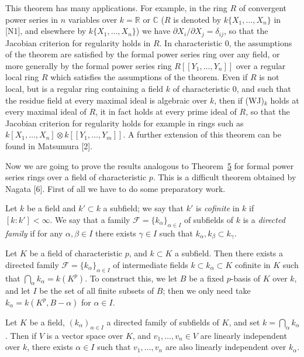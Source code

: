 This theorem has many applications. For example, in the ring $R$ of convergent
power series in $n$ variables over $k = \mathbb{R}$ or $\mathbb{C}$ ($R$ is denoted by
$k\{X_1, \ldots, X_n\}$ in [N1], and elsewhere by $k\{X_1, \ldots, X_n\}$) we have
$\partial X_i/\partial X_j = \delta_{ij}$, so that the Jacobian criterion for regularity holds in
$R$. In characteristic $0$, the assumptions of the theorem are satisfied by the
formal power series ring over any field, or more generally by the formal power
series ring $R[[Y_1, \ldots, Y_n]]$ over a regular local ring $R$ which satisfies the
assumptions of the theorem. Even if $R$ is not local, but is a regular ring
containing a field $k$ of characteristic $0$, and such that the residue field at
every maximal ideal is algebraic over $k$, then if (WJ)$_k$ holds at every maximal
ideal of $R$, it in fact holds at every prime ideal of $R$, so that the Jacobian
criterion for regularity holds for example in rings such as
$k[X_1, \ldots, X_n] \otimes k[[Y_1, \ldots, Y_m]]$. A further extension of this theorem can be
found in Matsumura [2].

Now we are going to prove the results analogous to Theorem~\hyperref[thm:30.5]{5} for formal
power series rings over a field of characteristic $p$. This is a difficult theorem
obtained by Nagata [6]. First of all we have to do some preparatory work.

Let $k$ be a field and $k' \subset k$ a subfield; we say that $k'$ is \emph{cofinite} in $k$ if
$[k : k'] < \infty$. We say that a family $\mathcal{F} = \{k_\alpha\}_{\alpha \in I}$ of subfields of $k$ is
a \emph{directed family} if for any $\alpha, \beta \in I$ there exists $\gamma \in I$ such that
$k_\alpha, k_\beta \subset k_\gamma$.

Let $K$ be a field of characteristic $p$, and $k \subset K$ a subfield. Then there
exists a directed family $\mathcal{F} = \{k_\alpha\}_{\alpha \in I}$ of intermediate fields
$k \subset k_\alpha \subset K$ cofinite in $K$ such that $\bigcap_\alpha k_\alpha = k(K^p)$. To construct
this, we let $B$ be a fixed $p$-basis of $K$ over $k$, and let $I$ be the set of all
finite subsets of $B$; then we only need take $k_\alpha = k(K^p, B - \alpha)$ for
$\alpha \in I$.

\begin{lemma}\label{lem:30.3}
Let $K$ be a field, $(k_\alpha)_{\alpha \in I}$ a directed family of subfields of $K$, and set
$k = \bigcap_\alpha k_\alpha$. Then if $V$ is a vector space over $K$, and
$v_1, \ldots, v_n \in V$ are linearly independent over $k$, there exists $\alpha \in I$ such that
$v_1, \ldots, v_n$ are also linearly independent over $k_\alpha$.
\end{lemma}

